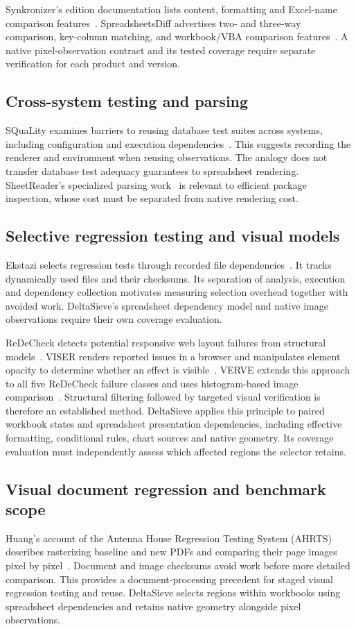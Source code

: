 Synkronizer's edition documentation lists content, formatting and Excel-name
comparison features~\cite{synkronizer}. SpreadsheetsDiff advertises two- and
three-way comparison, key-column matching, and workbook/VBA comparison
features~\cite{spreadsheetsdiff}. A native pixel-observation contract and its tested
coverage require separate verification for each product and version.

\subsection{Cross-system testing and parsing}
SQuaLity examines barriers to reusing database test suites across systems,
including configuration and execution dependencies~\cite{squality}. This suggests
recording the renderer and environment when reusing observations. The analogy
does not transfer database test adequacy guarantees to spreadsheet rendering.
SheetReader's specialized parsing work~\cite{sheetreader} is relevant to efficient
package inspection, whose cost must be separated from native rendering cost.

\subsection{Selective regression testing and visual models}
Ekstazi selects regression tests through recorded file dependencies~\cite{ekstazi}.
It tracks dynamically used files and their checksums.
Its separation of analysis, execution and dependency collection motivates
measuring selection overhead together with avoided work. DeltaSieve's
spreadsheet dependency model and native image observations require their own
coverage evaluation.

ReDeCheck detects potential responsive web layout failures from structural
models~\cite{redecheck}. VISER renders reported issues in a browser and manipulates
element opacity to determine whether an effect is visible~\cite{althomali2019viser}.
VERVE extends this approach to all five ReDeCheck failure classes and uses
histogram-based image comparison~\cite{althomali2021verve}. Structural filtering
followed by targeted visual verification is therefore an established method.
DeltaSieve applies this principle to paired workbook states and spreadsheet
presentation dependencies, including effective formatting, conditional rules,
chart sources and native geometry. Its coverage evaluation must independently
assess which affected regions the selector retains.

\subsection{Visual document regression and benchmark scope}
Huang's account of the Antenna House Regression Testing System (AHRTS) describes
rasterizing baseline and new PDFs and comparing their page images pixel by
pixel~\cite{huang2014ahrts}. Document and image checksums avoid work before
more detailed comparison. This provides a document-processing precedent for
staged visual regression testing and reuse. DeltaSieve selects regions within
workbooks using spreadsheet dependencies and retains native geometry alongside
pixel observations.

